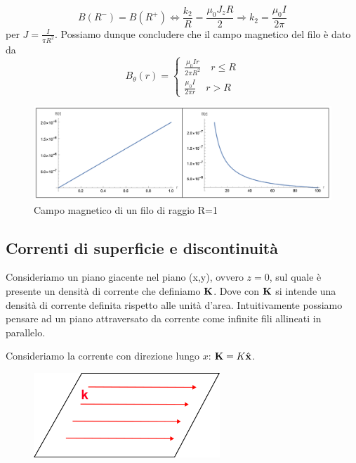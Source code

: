 \begin{equation*}
	B(R^-) = B(R^+) \iff	 \frac{k_2}{R} = \frac{\mu_0J_zR}{2} \Rightarrow k_2 = \frac{\mu_0I}{2\pi}
\end{equation*} 
per $J = \frac{I}{\pi R^2}$. Possiamo dunque concludere che il campo magnetico del filo \`e dato da 
\begin{equation*}
	B_\theta (r) = \left \{ \begin{array}{l}
		\frac{\mu_0Ir}{2 \pi R^2} \quad r \leq R \\
		\frac{\mu_0I}{2 \pi r} \quad r > R
	\end{array}\right.
\end{equation*}  
\begin{figure}[!ht]
\vspace{0.1in}
\includegraphics[scale = 0.48]{images/wiremagneticfield}	
\centering
\vspace{0.1in}
\caption{Campo magnetico di un filo di raggio R=1}
\end{figure}

\subsection{Correnti di superficie e discontinuit\`a}

Consideriamo un piano giacente nel piano (x,y), ovvero $z = 0$, sul quale \`e presente un densit\`a di corrente che definiamo $\bold{K}$. Dove con $\bold{K}$ si intende una densit\`a di corrente definita rispetto alle unit\`a d'area. Intuitivamente possiamo pensare ad un piano attraversato da corrente come infinite fili allineati in parallelo.

Consideriamo la corrente con direzione lungo $x$: $\bold{K} = K \hat{\bold{x}}$.
\begin{figure}[!ht]
\vspace{0.1in}
\includegraphics[width = 7cm]{images/charplane}	
\centering
\vspace{0.1in}
\end{figure}

